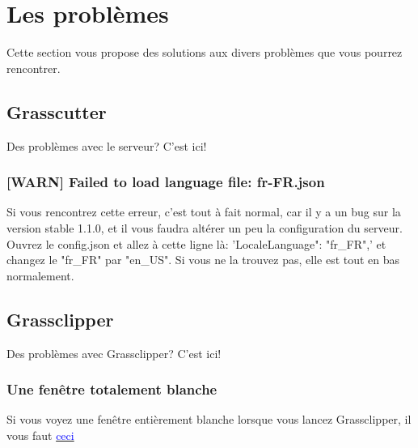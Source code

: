 \documentclass{article}
\begin{document}
\hrulefill

\section{Les problèmes}
Cette section vous propose des solutions aux divers problèmes que vous pourrez rencontrer.

\subsection{Grasscutter}
Des problèmes avec le serveur? C'est ici!

\subsubsection{[WARN] Failed to load language file: fr-FR.json}
Si vous rencontrez cette erreur, c'est tout à fait normal, car il y a un bug sur la version stable 1.1.0, et il vous faudra altérer un peu la configuration du serveur.\newline
Ouvrez le config.json et allez à cette ligne là: 'LocaleLanguage": "fr\_FR",' et changez le "fr\_FR" par "en\_US".\newline
Si vous ne la trouvez pas, elle est tout en bas normalement.

\subsection{Grassclipper}
Des problèmes avec Grassclipper? C'est ici!

\subsubsection{Une fenêtre totalement blanche}
Si vous voyez une fenêtre entièrement blanche lorsque vous lancez Grassclipper, il vous faut \href{https://developer.microsoft.com/en-us/microsoft-edge/webview2/#download}{\textcolor{blue}{ceci}}
\end{document}
